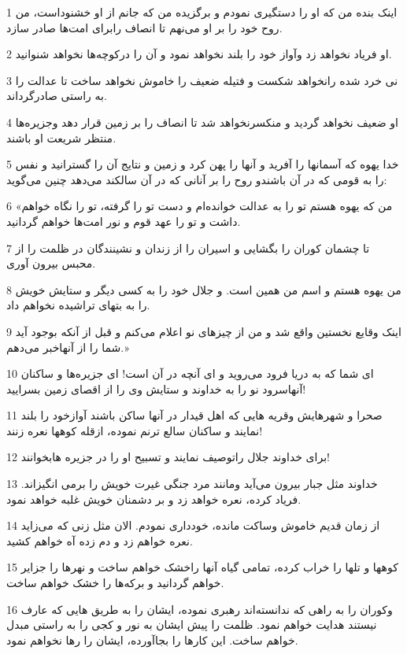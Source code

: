 \par 1 اینک بنده من که او را دستگیری نمودم و برگزیده من که جانم از او خشنوداست، من روح خود را بر او می‌نهم تا انصاف رابرای امت‌ها صادر سازد.
\par 2 او فریاد نخواهد زد وآواز خود را بلند نخواهد نمود و آن را درکوچه‌ها نخواهد شنوانید.
\par 3 نی خرد شده رانخواهد شکست و فتیله ضعیف را خاموش نخواهد ساخت تا عدالت را به راستی صادرگرداند.
\par 4 او ضعیف نخواهد گردید و منکسرنخواهد شد تا انصاف را بر زمین قرار دهد وجزیره‌ها منتظر شریعت او باشند.
\par 5 خدا یهوه که آسمانها را آفرید و آنها را پهن کرد و زمین و نتایج آن را گسترانید و نفس را به قومی که در آن باشندو روح را بر آنانی که در آن سالکند می‌دهد چنین می‌گوید:
\par 6 «من که یهوه هستم تو را به عدالت خوانده‌ام و دست تو را گرفته، تو را نگاه خواهم داشت و تو را عهد قوم و نور امت‌ها خواهم گردانید.
\par 7 تا چشمان کوران را بگشایی و اسیران را از زندان و نشینندگان در ظلمت را از محبس بیرون آوری.
\par 8 من یهوه هستم و اسم من همین است. و جلال خود را به کسی دیگر و ستایش خویش را به بتهای تراشیده نخواهم داد.
\par 9 اینک وقایع نخستین واقع شد و من از چیزهای نو اعلام می‌کنم و قبل از آنکه بوجود آید شما را از آنهاخبر می‌دهم.»
\par 10 ‌ای شما که به دریا فرود می‌روید و ای آنچه در آن است! ای جزیره‌ها و ساکنان آنهاسرود نو را به خداوند و ستایش وی را از اقصای زمین بسرایید!
\par 11 صحرا و شهرهایش وقریه هایی که اهل قیدار در آنها ساکن باشند آوازخود را بلند نمایند و ساکنان سالع ترنم نموده، ازقله کوهها نعره زنند!
\par 12 برای خداوند جلال راتوصیف نمایند و تسبیح او را در جزیره هابخوانند!
\par 13 خداوند مثل جبار بیرون می‌آید ومانند مرد جنگی غیرت خویش را برمی انگیزاند. فریاد کرده، نعره خواهد زد و بر دشمنان خویش غلبه خواهد نمود.
\par 14 از زمان قدیم خاموش وساکت مانده، خودداری نمودم. الان مثل زنی که می‌زاید نعره خواهم زد و دم زده آه خواهم کشید.
\par 15 کوهها و تلها را خراب کرده، تمامی گیاه آنها راخشک خواهم ساخت و نهرها را جزایر خواهم گردانید و برکه‌ها را خشک خواهم ساخت.
\par 16 وکوران را به راهی که ندانسته‌اند رهبری نموده، ایشان را به طریق هایی که عارف نیستند هدایت خواهم نمود. ظلمت را پیش ایشان به نور و کجی را به راستی مبدل خواهم ساخت. این کارها را بجاآورده، ایشان را رها نخواهم نمود.
